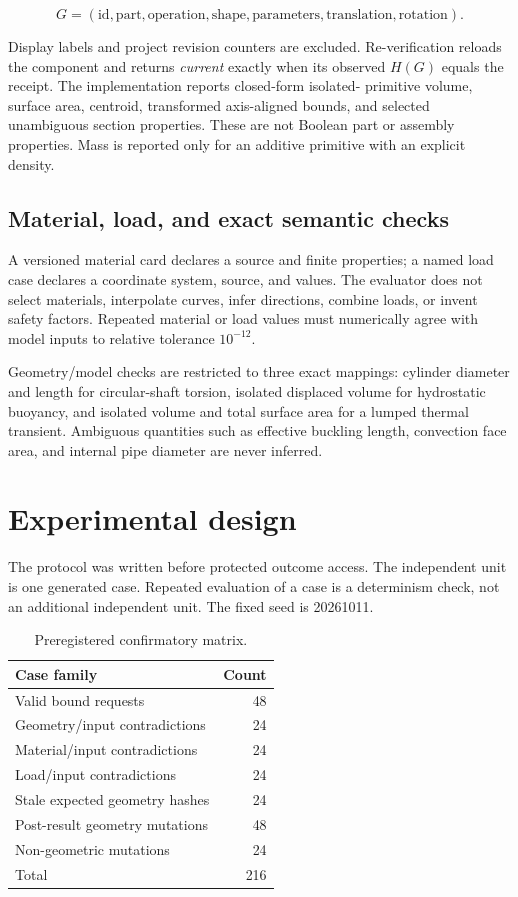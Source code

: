 \documentclass[10pt]{article}
\begin{document}
\begin{equation}
G=(\text{id},\text{part},\text{operation},\text{shape},\text{parameters},
\text{translation},\text{rotation}).
\end{equation}

Display labels and project revision counters are excluded. Re-verification
reloads the component and returns \emph{current} exactly when its observed
$H(G)$ equals the receipt. The implementation reports closed-form isolated-
primitive volume, surface area, centroid, transformed axis-aligned bounds, and
selected unambiguous section properties. These are not Boolean part or assembly
properties. Mass is reported only for an additive primitive with an explicit
density.

\subsection{Material, load, and exact semantic checks}

A versioned material card declares a source and finite properties; a named
load case declares a coordinate system, source, and values. The evaluator does
not select materials, interpolate curves, infer directions, combine loads, or
invent safety factors. Repeated material or load values must numerically agree
with model inputs to relative tolerance $10^{-12}$.

Geometry/model checks are restricted to three exact mappings: cylinder
diameter and length for circular-shaft torsion, isolated displaced volume for
hydrostatic buoyancy, and isolated volume and total surface area for a lumped
thermal transient. Ambiguous quantities such as effective buckling length,
convection face area, and internal pipe diameter are never inferred.

\section{Experimental design}

The protocol was written before protected outcome access. The independent unit
is one generated case. Repeated evaluation of a case is a determinism check,
not an additional independent unit. The fixed seed is 20261011.

\begin{table}[t]
\centering
\caption{Preregistered confirmatory matrix.}
\label{tab:matrix}
\begin{tabular}{@{}lr@{}}
\toprule
Case family & Count \\
\midrule
Valid bound requests & 48 \\
Geometry/input contradictions & 24 \\
Material/input contradictions & 24 \\
Load/input contradictions & 24 \\
Stale expected geometry hashes & 24 \\
Post-result geometry mutations & 48 \\
Non-geometric mutations & 24 \\
\midrule
Total & 216 \\
\bottomrule
\end{tabular}
\end{table}
\end{document}
